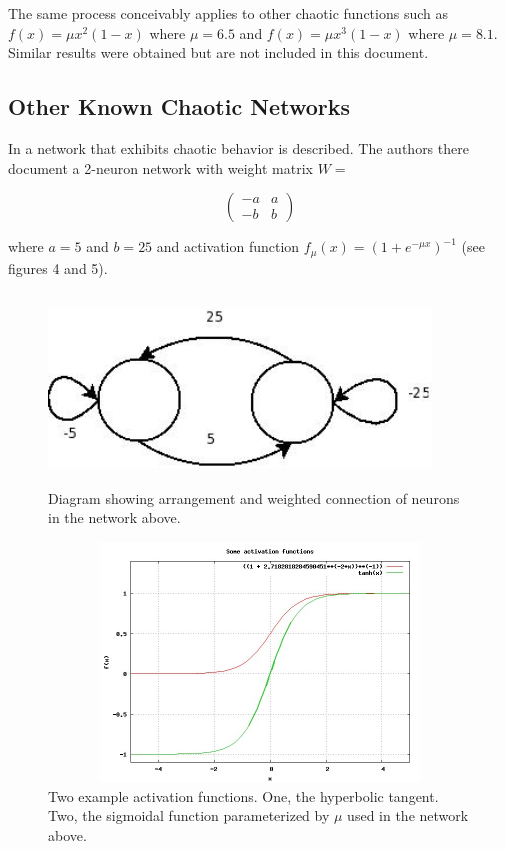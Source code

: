 \documentclass[12pt]{article}
\begin{document}
The same process conceivably applies to other chaotic functions such as
$f(x) = \mu  x^{2} (1-x)$ where $\mu=6.5$ and $f(x)=\mu x^{3} (1-x)$
where $\mu=8.1$.  Similar results were obtained but are not included in this
document.
\clearpage

\subsection{Other Known Chaotic Networks}
In \cite{sole} a network that exhibits chaotic behavior is described.  The
authors there document a 2-neuron network with weight matrix $W=$

\[ \left( \begin{array}{cc}
        -a & a \\
        -b & b \end{array} \right)\]

where $a=5$ and $b=25$ and activation
function $f_{\mu}(x) = (1 + e^{-\mu x})^{-1}$ (see figures 4 and 5).

\begin{figure}[htb]
\begin{center}
\includegraphics[height=2in,width=4in]{images/the_network_in_question_simple.jpeg}
\caption{Diagram showing arrangement and weighted connection of neurons in the network above.}
\end{center}
\end{figure}
\begin{figure}[htb]
\begin{center}
\includegraphics[height=2.5in,width=4.5in]{images/activation_funcs.jpg}
\caption{Two example activation functions.  One, the hyperbolic tangent.  Two, the sigmoidal function parameterized by $\mu$ used in the network above.}
\end{center}
\end{figure}
\end{document}
